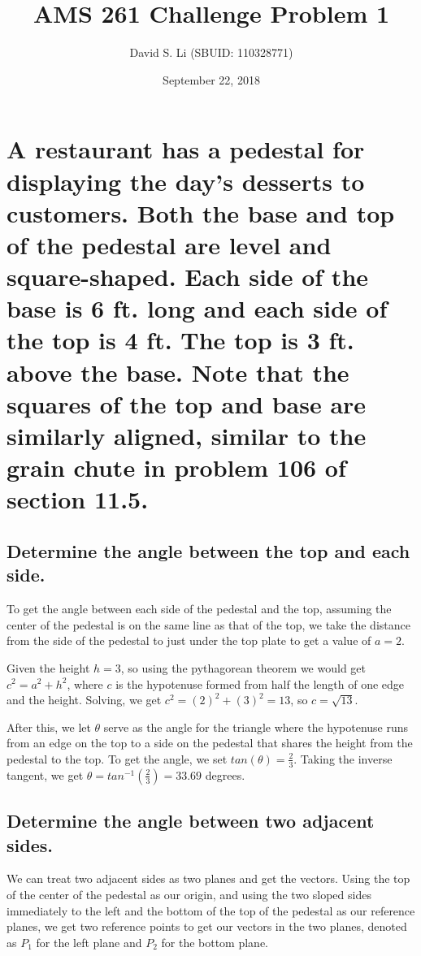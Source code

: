 \documentclass{article}
\title{AMS 261 Challenge Problem 1}
\author{David S. Li (SBUID: 110328771)}
\date{September 22, 2018}
\begin{document}
\maketitle

\section{A restaurant has a pedestal for displaying the day’s desserts to customers. Both the base and top of the pedestal are level and square-shaped. Each side of the base is 6 ft. long and each side of the top is 4 ft. The top is 3 ft. above the base. Note that the squares of the top and base are similarly aligned, similar to the grain chute in problem 106 of section 11.5.}

\subsection{Determine the angle between the top and each side.}

\par\noindent\large To get the angle between each side of the pedestal and the top, assuming the center of the pedestal is on the same line as that of the top, we take the distance from the side of the pedestal to just under the top plate to get a value of $a = 2$.\vspace{0.25cm}
\par\noindent\large Given the height $h = 3$, so using the pythagorean theorem we would get $c^{2} = a^{2} + h^{2}$, where $c$ is the hypotenuse formed from half the length of one edge and the height.  Solving, we get $c^{2} = (2)^{2} + (3)^{2} = 13$, so $c = \sqrt{13}$.
\par\vspace{0.25cm}\noindent\large After this, we let $\theta$ serve as the angle for the triangle where the hypotenuse runs from an edge on the top to a side on the pedestal that shares the height from the pedestal to the top.  To get the angle, we set $tan(\theta) = \frac{2}{3}$.  Taking the inverse tangent, we get $\theta = tan^{-1}(\frac{2}{3}) = 33.69$ degrees.

\subsection{Determine the angle between two adjacent sides.}

\par\noindent\large We can treat two adjacent sides as two planes and get the vectors.  Using the top of the center of the pedestal as our origin, and using the two sloped sides immediately to the left and the bottom of the top of the pedestal as our reference planes, we get two reference points to get our vectors in the two planes, denoted as $P_{1}$ for the left plane and $P_{2}$ for the bottom plane. \vspace{0.25cm}
\end{document}
